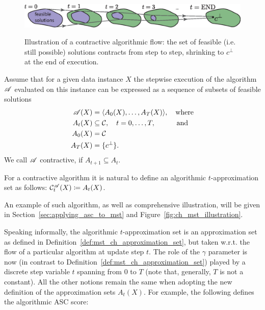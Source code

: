 \begin{figure}[ht!]
  \centering
  \includegraphics[width=\textwidth]{figures/ch_mst/contractive_alg}
  \\[.5cm]
  \caption{Illustration of a contractive algorithmic flow: the set of
    feasible (i.e. still possible) solutions contracts from step to step,
    shrinking to $c^\bot$ at the end of execution.}
  \label{fig:mst_contractive_algorithm}
\end{figure}

\begin{definition}
\label{def:contractive_algorithm}
  Assume that for a given data instance $X$ the stepwise execution of the
  algorithm $\mathscr{A}$ evaluated on this instance can be expressed as a sequence of
  subsets of feasible solutions
  \begin{align}
    \mathscr{A}(X) &= \langle A_0(X), \ldots, A_T(X)
    \rangle,
    \quad\text{where} \notag \\
    A_t(X) &\subseteq {\cal C}, \quad t = 0, \ldots, T, \qquad\quad
    \text{and} \notag\\
    A_0(X) &= {\cal C} \notag \\ 
    A_T(X) &= \{c^\bot\}.
  \end{align}
  We call $\mathscr{A}$ contractive, if $A_{t+1} \subseteq
  A_{t}$.  
\end{definition}

\begin{definition}\label{def:algorithmic_approximation_set}
  For a contractive algorithm it is natural to define an algorithmic
  $t$-approximation set as follows: ${\cal C}^{\mathscr{A}}_t(X) \coloneqq A_t(X)$.
\end{definition}

An example of such algorithm, as well as comprehensive illustration, will be
given in Section~\ref{sec:applying_asc_to_mst} and
Figure~\ref{fig:ch_mst_illustration}.

Speaking informally, the algorithmic $t$-approximation set is an approximation
set as defined in Definition~\ref{def:mst_ch_approximation_set}, but taken
w.r.t. the flow of a particular algorithm at update step $t$. The role of the
$\gamma$ parameter is now (in contrast to
Definition~\ref{def:mst_ch_approximation_set}) played by a discrete step
variable $t$ spanning from $0$ to $T$ (note that, generally, $T$ is not a
constant). All the other notions remain the same when adopting the new
definition of the approximation sets $A_t(X)$. For example, the following
defines the algorithmic ASC score:

